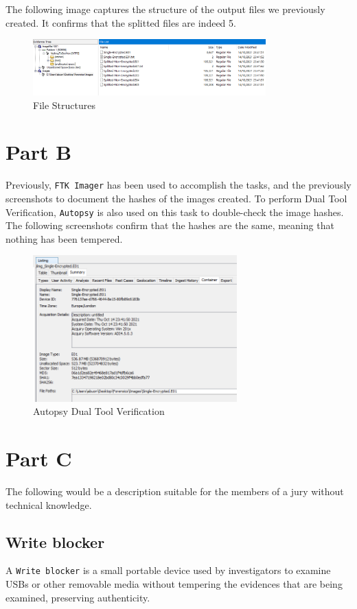 The following image captures the structure of the output files we previously
created. It confirms that the splitted files are indeed 5.

\begin{figure}[H]
  \centering
  \includegraphics[width=0.8\textwidth]{figures/folder-structure}
  \caption{File Structures}
  \label{f:folder-structure}
\end{figure}

\section{Part B}
\label{s:task1-part-b}
Previously, \lstinline{FTK Imager} has been used to accomplish the tasks, and
the previously screenshots to document the hashes of the images created. To
perform Dual Tool Verification, \lstinline{Autopsy} is also used on this task to
double-check the image hashes. The following screenshots confirm that the hashes
are the same, meaning that nothing has been tempered.

\begin{figure}[H]
  \centering
  \includegraphics[width=0.7\textwidth]{figures/autopsy-hashes}
  \caption{Autopsy Dual Tool Verification}
  \label{f:autopsy-hashes}
\end{figure}

\section{Part C}
\label{s:task1-part-c}
The following would be a description suitable for the members of a jury without
technical knowledge.

\subsection{Write blocker}
\label{s:write-blocker}
A \lstinline{Write blocker} is a small portable device used by investigators to examine USBs
or other removable media without tempering the evidences that are being examined,
preserving authenticity.
